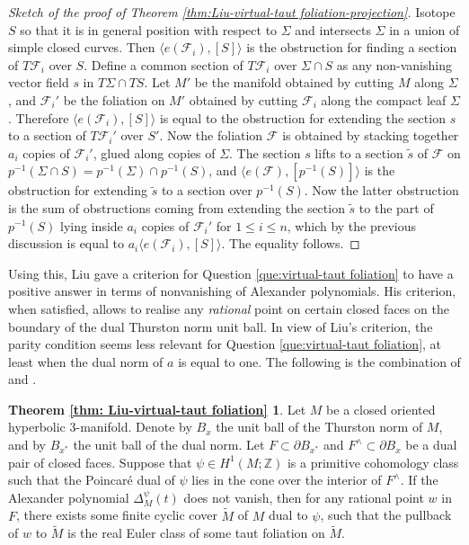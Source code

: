 \documentclass[11pt]{amsart}
\theoremstyle{remark}
\theoremstyle{definition}
\begin{document}
\begin{proof}[Sketch of the proof of Theorem \ref{thm:Liu-virtual-taut foliation-projection}]
	Isotope $S$ so that it is in general position with respect to $\Sigma$ and intersects $\Sigma$ in a union of simple closed curves. Then $\langle e(\mathcal{F}_i) , [S] \rangle $ is the obstruction for finding a section of $T \mathcal{F}_i$ over $S$. Define a common section of $T \mathcal{F}_i$ over $\Sigma \cap S$ as any non-vanishing vector field $s$ in $T \Sigma \cap T S$. Let $M'$ be the manifold obtained by cutting $M$ along $\Sigma$, and $\mathcal{F}_i'$ be the foliation on $M'$ obtained by cutting $\mathcal{F}_i$ along the compact leaf $\Sigma$.  Therefore $\langle e(\mathcal{F}_i) , [S] \rangle $ is equal to the obstruction for extending the section $s$ to a section of $T \mathcal{F}_i'$ over $S'$. Now the foliation $\mathcal{F}$ is obtained by stacking together $a_i$ copies of $\mathcal{F}_i'$, glued along copies of $\Sigma$. The section $s$ lifts to a section $\tilde{s}$ of $\mathcal{F}$ on $p^{-1}(\Sigma \cap S) = p^{-1}(\Sigma) \cap p^{-1}(S) $, and $\langle e(\mathcal{F}) , [p^{-1}(S)] \rangle $ is the obstruction for extending $\tilde{s}$ to a section over $p^{-1}(S)$. Now the latter obstruction is the sum of obstructions coming from extending the section $\tilde{s}$ to the part of $p^{-1}(S)$ lying inside $a_i$ copies of $\mathcal{F}_i'$ for $1 \leq i \leq n$, which by the previous discussion is equal to $ a_i \langle e(\mathcal{F}_i) , [S] \rangle $. The equality follows. 

\end{proof}
	
	Using this, Liu \cite{liu2024criterion} gave a criterion for Question \ref{que:virtual-taut foliation} to have a positive answer in terms of nonvanishing of Alexander polynomials. His criterion, when satisfied, allows to realise any \emph{rational} point on certain closed faces on the boundary of the dual Thurston norm unit ball. In view of Liu's criterion, the parity condition seems less relevant for Question \ref{que:virtual-taut foliation}, at least when the dual norm of $a$ is equal to one. The following is the combination of \cite[Theorem 1.2]{liu2024criterion} and \cite[Corollary 1.3]{liu2024criterion}.
	
	\theoremstyle{theorem}
	\newtheorem*{Liu}{Theorem \ref{thm: Liu-virtual-taut foliation}}
	\begin{Liu}
		Let $M$ be a closed oriented hyperbolic 3-manifold. Denote by $B_x$ the unit ball of the Thurston norm of $M$, and by $B_{x^*}$ the unit ball of the dual norm. Let $F \subset \partial B_{x^*}$ and $F^\wedge \subset \partial B_{x}$ be a dual pair of closed faces. Suppose that $\psi \in H^1(M ; \mathbb{Z}) $ is a primitive cohomology class such that the Poincar\'{e} dual of $\psi$ lies in the cone over the interior of $F^\wedge$. 
		If the Alexander polynomial $\Delta_M^{\psi}(t)$ does not vanish, then for any rational point $w$ in $F$, there exists some finite cyclic cover $\tilde{M}$ of $M$ dual to $\psi$, such that the pullback of $w$ to $\tilde{M}$ is the real Euler class of some taut foliation on $\tilde{M}$.
	\end{Liu}	
	
\end{document}
